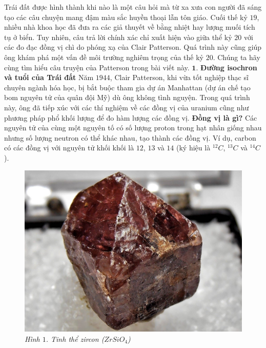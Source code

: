 \begin{multicols}{2}
	Trái đất được hình thành khi nào là một câu hỏi mà từ xa xưa con người đã sáng tạo các câu chuyện mang đậm màu sắc huyền thoại lẫn tôn giáo. Cuối thế kỷ $19$, nhiều nhà khoa học đã đưa ra các giả thuyết về bằng nhiệt hay lượng muối tích tụ ở biển. Tuy nhiên, câu trả lời chính xác chỉ xuất hiện vào giữa thể kỷ $20$ với các đo đạc đồng vị chì do phóng xạ của Clair Patterson. Quá trình này cũng giúp ông khám phá một vấn đề môi trường nghiêm trọng của thế kỷ $20$. Chúng ta hãy cùng tìm hiểu câu truyện của Patterson trong bài viết này.
	\vskip 0.1cm
	$\pmb{1.}$ \textbf{\color{timhieukhoahoc}Đường isochron và tuổi của Trái đất}
	\vskip 0.1cm
	Năm $1944$, Clair Patterson, khi vừa tốt nghiệp thạc sĩ chuyên ngành hóa học, bị bắt buộc tham gia dự án Manhattan (dự án chế tạo bom nguyên tử của quân đội Mỹ) dù ông không tình nguyện. Trong quá trình này, ông đã tiếp xúc với các thí nghiệm về các đồng vị của uranium cũng như phương pháp phổ khối lượng để đo hàm lượng các đồng vị.
	\vskip 0.1cm
	\textbf{\color{timhieukhoahoc}Đồng vị là gì?}
	\vskip 0.1cm
	Các nguyên tử của cùng một nguyên tố có số lượng proton trong hạt nhân giống nhau nhưng số lượng neutron có thể khác nhau, tạo thành các đồng vị. Ví dụ, carbon có các đồng vị với nguyên tử khối khối là $12$, $13$ và $14$ (ký hiệu là $^{12}{C}$, $^{13}{C}$ và $^{14}{C}$).
	\begin{figure}[H]
		\vspace*{-5pt}
		\centering
		\captionsetup{labelformat= empty, justification=centering}
		\includegraphics[width= 1\linewidth]{1}
		\caption{\small\textit{\color{timhieukhoahoc}Hình $1$. Tinh thể zircon (${ZrSiO}_4$)}}

\end{figure}
\end{multicols}

